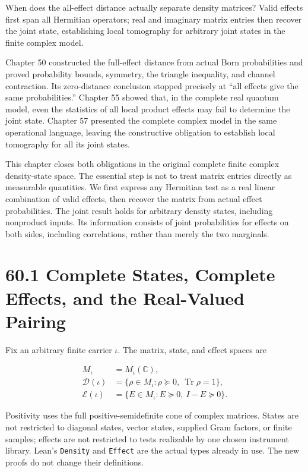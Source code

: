 \documentclass[
  11pt,
  oneside]{book}
\begin{document}
When does the all-effect distance actually separate density matrices?
Valid effects first span all Hermitian operators; real and imaginary
matrix entries then recover the joint state, establishing local
tomography for arbitrary joint states in the finite complex model.

Chapter 50 constructed the full-effect distance from actual Born
probabilities and proved probability bounds, symmetry, the triangle
inequality, and channel contraction. Its zero-distance conclusion
stopped precisely at ``all effects give the same probabilities.''
Chapter 55 showed that, in the complete real quantum model, even the
statistics of all local product effects may fail to determine the joint
state. Chapter 57 presented the complete complex model in the same
operational language, leaving the constructive obligation to establish
local tomography for all its joint states.

This chapter closes both obligations in the original complete finite
complex density-state space. The essential step is not to treat matrix
entries directly as measurable quantities. We first express any
Hermitian test as a real linear combination of valid effects, then
recover the matrix from actual effect probabilities. The joint result
holds for arbitrary density states, including nonproduct inputs. Its
information consists of joint probabilities for effects on both sides,
including correlations, rather than merely the two marginals.

\section{60.1 Complete States, Complete Effects, and the Real-Valued
Pairing}

Fix an arbitrary finite carrier \(\iota\). The matrix, state, and effect
spaces are

\[
\begin{aligned}
M_\iota&=M_\iota(\mathbb C),\\
\mathcal D(\iota)&=\{\rho\in M_\iota:\rho\succeq0,\ \operatorname{Tr}\rho=1\},\\
\mathcal E(\iota)&=\{E\in M_\iota:E\succeq0,\ I-E\succeq0\}.
\end{aligned}
\]

Positivity uses the full positive-semidefinite cone of complex matrices.
States are not restricted to diagonal states, vector states, supplied
Gram factors, or finite samples; effects are not restricted to tests
realizable by one chosen instrument library. Lean's \texttt{Density} and
\texttt{Effect} are the actual types already in use. The new proofs do
not change their definitions.
\end{document}
